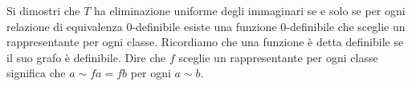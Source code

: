\begin{exercise}
Si dimostri che $T$ ha eliminazione uniforme degli immaginari se e solo se per ogni relazione di equivalenza $0$-definibile esiste una funzione $0$-definibile che sceglie un rappresentante per ogni classe. Ricordiamo che una funzione \`e detta definibile se il suo grafo \`e definibile. Dire che $f$ sceglie un rappresentante per ogni classe significa che $a\sim fa= fb$ per ogni $a\sim b$.\QED
\end{exercise}
\begin{comment}

\section{Eliminazione degli immaginari via sintassi.}

Basandoci su un linguaggio del prim'ordine $L$ introdurremo ora un insieme di formule pi\`u ampio di quelle introdotte nel capitolo~\ref{formule}. Le chiameremo formule del secondo ordine. L'insieme delle formule del secondo ordine verr\`a indicato con $L''$.

Riprendiamo la definizione di formula introdotta nel capitolo~\ref{formule}.

\begin{definition}\label{defformule2} I termini di $L''$ sono gli stessi che per il corrispondente linguaggio prim'ordine. Ogni formula atomica del prim'ordine \`e una una formula atomica di $L''$, altre formule atomiche vengono definite come segue. 

Per ogni formula del prim'odine $\sigma(x;y)$ fissiamo un insieme infinito di variabili che chiameremo variabili di sorta $\sigma(x;y)$. Queste variabili sono distinte da quelle del prim'ordine e verranno indicate conconosci i caratteri $\X,\Y,\Z$, ecc. Se $\Y$ \`e una variabile di sorta $\sigma(x;y)$ e $t$ \`e una tupla di termini della stessa lunghezza di $x$ allora $t\in\Y$ \`e una formula atomica. 

Tutte le altre formule vengono costruite a partire da quelle atomiche tramite le clausule ricorsive della definizione~\ref{defformule}
\end{definition}

Si noti che non abbiamo introdotto quantificatori sulle variabili del secondo ordine. Una variabile $\Y$ di sorta $\sigma(x;y)$ penseremo correre tra gli insiemi definibili della forma $\sigma(\U,a)$, quindi quantificare su $\Y$ \`e equivalente a sistituire tutte le occorrenze della formula $t\in\Y$ con $\sigma(t,y)$ e a quantificare su $y$. 


\end{comment}
